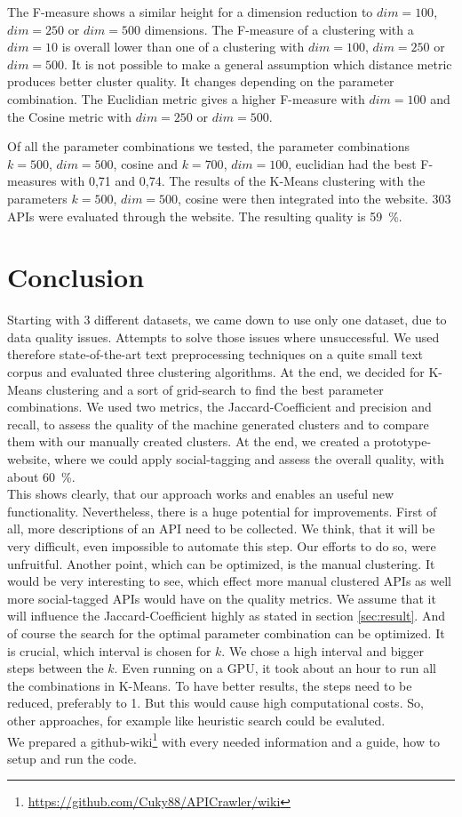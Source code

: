 \documentclass[a4paper]{IEEEtran}
\begin{document}
The F-measure shows a similar height for a dimension reduction to $dim ⁡= 100$, $dim⁡= 250$ or $dim⁡= 500$ dimensions. The F-measure of a clustering with a $dim=10$ is overall lower than one of a clustering with $dim⁡= 100$, $dim⁡= 250$ or $dim⁡= 500$. 
It is not possible to make a general assumption which distance metric produces better cluster quality. It changes depending on the parameter combination. The Euclidian metric gives a higher F-measure with $dim⁡= 100$ and the Cosine metric with $dim⁡= 250$ or $dim⁡= 500$.

Of all the parameter combinations we tested, the parameter combinations $k⁡= 500$, $dim⁡= 500$, cosine and $k⁡= 700$, $dim⁡= 100$, euclidian had the best F-measures with 0,71 and 0,74.
The results of the K-Means clustering with the parameters $k⁡= 500$, $dim⁡= 500$, cosine were then integrated into the website. 303 APIs were evaluated through the website. The resulting quality is 59~\%.

\section{Conclusion}
Starting with 3 different datasets, we came down to use only one dataset, due to data quality issues. Attempts to solve those issues where unsuccessful. We used therefore state-of-the-art text preprocessing techniques on a quite small text corpus and evaluated three clustering algorithms. At the end, we decided for K-Means clustering and a sort of grid-search to find the best parameter combinations. We used two metrics, the Jaccard-Coefficient and precision and recall, to assess the quality of the machine generated clusters and to compare them with our manually created clusters. At the end, we created a prototype-website, where we could apply social-tagging and assess the overall quality, with about 60~\%.\\

This shows clearly, that our approach works and enables an useful new functionality. Nevertheless, there is a huge potential for improvements. First of all, more descriptions of an API need to be collected. We think, that it will be very difficult, even impossible to automate this step. Our efforts to do so, were unfruitful. Another point, which can be optimized, is the manual clustering. It would be very interesting to see, which effect more manual clustered APIs as well more social-tagged APIs would have on the quality metrics. We assume that it will influence the Jaccard-Coefficient highly as stated in section \ref{sec:result}. And of course the search for the optimal parameter combination can be optimized. It is crucial, which interval is chosen for $k$. We chose a high interval and bigger steps between the $k$. Even running on a GPU, it took about an hour to run all the combinations in K-Means. To have better results, the steps need to be reduced, preferably to 1. But this would cause high computational costs. So, other approaches, for example like heuristic search could be evaluted.\\

We prepared a github-wiki\footnote{\url{https://github.com/Cuky88/APICrawler/wiki}} with every needed information and a guide, how to setup and run the code. 



\end{document}
